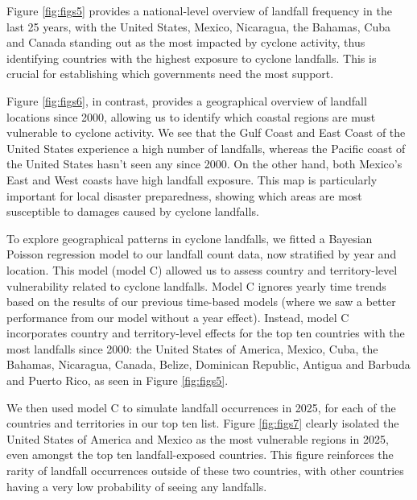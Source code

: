 \documentclass[
]{article}
\begin{document}
Figure \ref{fig:figs5} provides a national-level overview of landfall frequency in the last 25 years, with the United States, Mexico, Nicaragua, the Bahamas, Cuba and Canada standing out as the most impacted by cyclone activity, thus identifying countries with the highest exposure to cyclone landfalls. This is crucial for establishing which governments need the most support.

Figure \ref{fig:figs6}, in contrast, provides a geographical overview of landfall locations since 2000, allowing us to identify which coastal regions are must vulnerable to cyclone activity. We see that the Gulf Coast and East Coast of the United States experience a high number of landfalls, whereas the Pacific coast of the United States hasn't seen any since 2000. On the other hand, both Mexico's East and West coasts have high landfall exposure. This map is particularly important for local disaster preparedness, showing which areas are most susceptible to damages caused by cyclone landfalls.

To explore geographical patterns in cyclone landfalls, we fitted a Bayesian Poisson regression model to our landfall count data, now stratified by year and location. This model (model C) allowed us to assess country and territory-level vulnerability related to cyclone landfalls. Model C ignores yearly time trends based on the results of our previous time-based models (where we saw a better performance from our model without a year effect). Instead, model C incorporates country and territory-level effects for the top ten countries with the most landfalls since 2000: the United States of America, Mexico, Cuba, the Bahamas, Nicaragua, Canada, Belize, Dominican Republic, Antigua and Barbuda and Puerto Rico, as seen in Figure \ref{fig:figs5}.

We then used model C to simulate landfall occurrences in 2025, for each of the countries and territories in our top ten list. Figure \ref{fig:figs7} clearly isolated the United States of America and Mexico as the most vulnerable regions in 2025, even amongst the top ten landfall-exposed countries. This figure reinforces the rarity of landfall occurrences outside of these two countries, with other countries having a very low probability of seeing any landfalls.

\newpage
\end{document}
